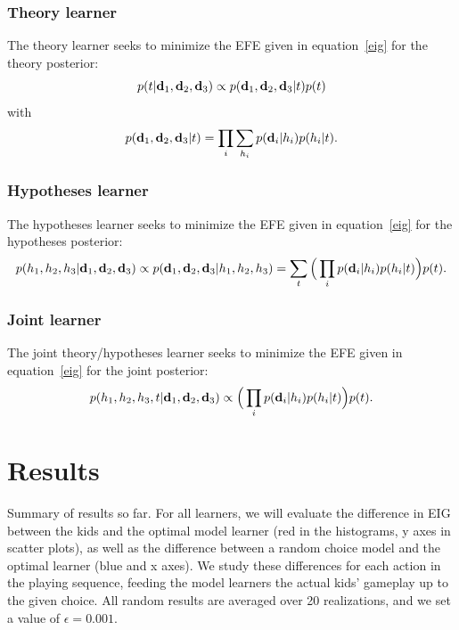 \documentclass[11pt, a4paper]{article}
\begin{document}
\subsubsection*{Theory learner}
The theory learner seeks to minimize the EFE given in equation~\eqref{eig} for the theory posterior:
\begin{equation}
p(t | {\textbf d_1}, {\textbf d_2}, {\textbf d_3}) \propto p({\textbf d_1}, {\textbf d_2}, {\textbf d_3}|t) p(t)
\end{equation}
with
\begin{equation}
p( {\textbf d_1}, {\textbf d_2}, {\textbf d_3} |t) = \prod_i \sum_{h_i} p({\textbf d_i} | h_i) p(h_i | t).
\end{equation}

\subsubsection*{Hypotheses learner}
The hypotheses learner seeks to minimize the EFE given in equation~\eqref{eig} for the hypotheses posterior:
\begin{equation}
\begin{split}
p(h_1, h_2, h_3 | {\textbf d_1}, {\textbf d_2}, {\textbf d_3}) \propto p({\textbf d_1}, {\textbf d_2}, {\textbf d_3} | h_1, h_2, h_3)=
\sum_t \Big( \prod_i p({\textbf d_i} | h_i) p(h_i | t) \Big) p(t).
\end{split}
\end{equation}

\subsubsection*{Joint learner}
The joint theory/hypotheses learner seeks to minimize the EFE given in equation~\eqref{eig} for the joint posterior:
\begin{equation}
\begin{split}
p(h_1, h_2, h_3, t | {\textbf d_1}, {\textbf d_2}, {\textbf d_3}) \propto \Big( \prod_i p({\textbf d_i} | h_i) p(h_i | t) \Big) p(t).
\end{split}
\end{equation}





\section*{Results}
Summary of results so far. For all learners, we will evaluate the difference in EIG between the kids and the optimal model learner (red in the histograms, y axes in scatter plots), as well as the difference between a random choice model and the optimal learner (blue and x axes). We study these differences for each action in the playing sequence, feeding the model learners the actual kids' gameplay up to the given choice. All random results are averaged over 20 realizations, and we set a value of $\epsilon=0.001$.
\end{document}
